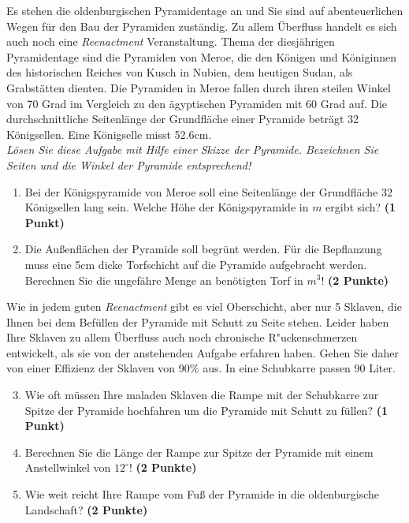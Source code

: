 \documentclass[a4paper, 9pt]{scrartcl}\usepackage[]{graphicx}\usepackage[]{xcolor}
\begin{document}
Es stehen die oldenburgischen Pyramidentage an und Sie sind auf
abenteuerlichen Wegen f{\"u}r den Bau der Pyramiden zust{\"a}ndig. Zu allem
{\"U}berfluss handelt es sich auch noch eine \textit{Reenactment}
Veranstaltung. Thema der diesj{\"a}hrigen Pyramidentage sind die Pyramiden von
Meroe, die den K{\"o}nigen und K{\"o}niginnen des historischen Reiches von Kusch in
Nubien, dem heutigen Sudan, als Grabst{\"a}tten dienten. Die Pyramiden in Meroe
fallen durch ihren steilen Winkel von 70 Grad im Vergleich zu
den {\"a}gyptischen Pyramiden mit 60 Grad auf. Die durchschnittliche
Seitenl{\"a}nge der Grundfl{\"a}che einer Pyramide betr{\"a}gt 32 K{\"o}nigsellen. Eine K{\"o}nigselle
misst 52.6cm.\\

\textit{L{\"o}sen Sie diese Aufgabe mit Hilfe einer Skizze der Pyramide. Bezeichnen
  Sie Seiten und die Winkel der Pyramide entsprechend!}

\begin{enumerate}
\item Bei der K{\"o}nigspyramide von Meroe soll eine Seitenl{\"a}nge der Grundfl{\"a}che
  32 K{\"o}nigsellen lang sein. Welche H{\"o}he der K{\"o}nigspyramide in $m$
  ergibt sich? \textbf{(1 Punkt)}
\item Die Au{\ss}enfl{\"a}chen der Pyramide soll begr{\"u}nt werden. F{\"u}r die
  Bepflanzung muss eine 5cm dicke Torfschicht auf die
  Pyramide aufgebracht werden. Berechnen Sie die ungef{\"a}hre Menge an
  ben{\"o}tigten Torf in $m^3$! \textbf{(2 Punkte)}
\end{enumerate}

Wie in jedem guten \textit{Reenactment} gibt es viel Oberschicht, aber nur
5 Sklaven, die Ihnen bei dem Bef{\"u}llen der Pyramide mit Schutt
zu Seite stehen. Leider haben Ihre Sklaven zu allem {\"U}berfluss auch noch
chronische R{"u}ckenschmerzen entwickelt, als sie von der
anstehenden Aufgabe erfahren haben. Gehen Sie daher von einer Effizienz der
Sklaven von 90\% aus. In eine Schubkarre passen
90 Liter.

\begin{enumerate}
  \setcounter{enumi}{2}
\item Wie oft m{\"u}ssen Ihre maladen Sklaven die Rampe mit der Schubkarre
  zur Spitze der Pyramide hochfahren um die Pyramide mit Schutt zu f{\"u}llen? \textbf{(1 Punkt)}
\item Berechnen Sie die L{\"a}nge der Rampe zur Spitze der Pyramide mit einem
  Anstellwinkel von $12^\circ$! \textbf{(2 Punkte)}
\item Wie weit reicht Ihre Rampe vom Fu{\ss} der Pyramide in die oldenburgische
  Landschaft?  \textbf{(2 Punkte)}
\end{enumerate}
\end{document}

